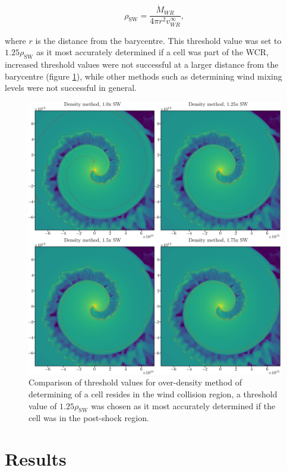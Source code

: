 \begin{equation}
  \rho_\text{SW} = \frac{\dot{M}_{WR}}{4 \pi r^2 v^\infty_{WR}},
\end{equation}

where $r$ is the distance from the barycentre. This threshold value was set to $1.25\rho_\text{SW}$ as it most accurately determined if a cell was part of the WCR, increased threshold values were not successful at a larger distance from the barycentre (figure \ref{fig:overdensity-threshold}), while other methods such as determining wind mixing levels were not successful in general.

\begin{figure}
  \centering
  \includegraphics[width=5in]{assets/overdensity-method.png}
  \caption[Comparison of threshold values for over-density method]{Comparison of threshold values for over-density method of determining of a cell resides in the wind collision region, a threshold value of $1.25\rho_\text{SW}$ was chosen as it most accurately determined if the cell was in the post-shock region.}
  \label{fig:overdensity-threshold}
\end{figure}

\section{Results}


